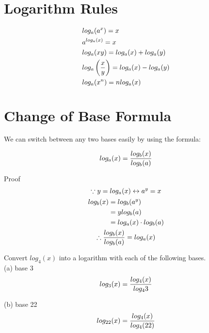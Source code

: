 \section{Logarithm Rules}

\begin{theorem}
	\begin{align}
		 & log_a(a^x) = x                                      \\
		 & a^{log_a(x)} = x                                    \\
		 & log_a(xy) = log_a(x) + log_a(y)                     \\
		 & log_a\left({x \over y}\right) = log_a(x) - log_a(y) \\
		 & log_a(x^n) = nlog_a(x)
	\end{align}
\end{theorem}

\section{Change of Base Formula}

We can switch between any two bases easily by using the formula: \\

\begin{theorem}
	\begin{align}
		log_a(x) = {log_b(x) \over log_b(a)}
	\end{align}
\end{theorem}

\begin{exercise}\nonumber
	Proof \\
	\begin{gather*}
		\because y = log_a(x) \leftrightarrow a^y = x \\
		\begin{align}
			log_b(x) & = log_b(a^y)              \\
			         & = ylog_b(a)               \\
			         & = log_a(x) \cdot log_b(a)
		\end{align}
		\\
		\therefore {log_b(x) \over log_b(a)} = log_a(x)
	\end{gather*}
\end{exercise}

\begin{exercise}\nonumber
	Convert $ log_4(x) $ into a logarithm with each of the following bases. \\

	(a) base 3 \\

	$$
		log_3(x) = {log_4(x) \over log_4{3}}
	$$

	(b) base 22 \\

	$$
		log_{22}(x) = {log_4(x) \over log_4(22)}
	$$
\end{exercise}

